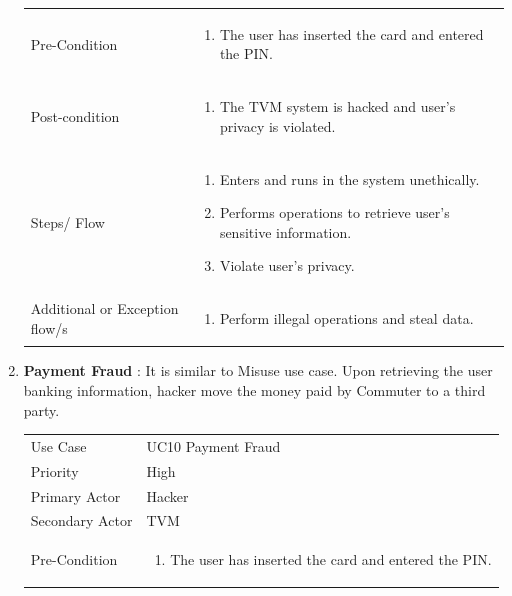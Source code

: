 \documentclass[15pt]{article}
\begin{document}
\begin{enumerate}[leftmargin=2em, itemsep=0pt, parsep=0pt, , font=\Large\bfseries]
\begin{tabularx}{1\textwidth} { 
  | >{\raggedright\arraybackslash}X 
  | >{\raggedright\arraybackslash}X 
  | }
 Pre-Condition  & 
 \begin{enumerate}
  \item  The user has inserted the card and entered the PIN.
  \end{enumerate}
  \\
  
   Post-condition  & \begin{enumerate}
  \item The TVM system is hacked and user’s privacy is violated.
  \end{enumerate}
  \\
  
  Steps/ Flow  & \begin{enumerate}
  \item Enters and runs in the system unethically.
  \item Performs operations to retrieve user’s sensitive information.
  \item Violate user’s privacy.
  \end{enumerate}
  \\
  
   Additional or Exception flow/s  & \begin{enumerate}
  \item  Perform illegal operations and steal data.
  \end{enumerate}
  \\

\hline
\end{tabularx}

\newpage
\item {\Large\bfseries{Payment Fraud}} :  It is similar to Misuse use case. Upon retrieving the user banking information, hacker move the money paid by Commuter to a third party. 
\newline
\newline
\begin{tabularx}{1\textwidth} { 
  | >{\raggedright\arraybackslash}X 
  | >{\raggedright\arraybackslash}X 
  | }
 \hline
 Use Case &   UC10 Payment Fraud \\
 Priority & High \\
 Primary Actor  & Hacker \\
 Secondary Actor  & TVM \\

 Pre-Condition  & 
 \begin{enumerate}
  \item  The user has inserted the card and entered the PIN.
  \end{enumerate}
  \\
  

\end{tabularx}
\end{enumerate}
\end{document}
